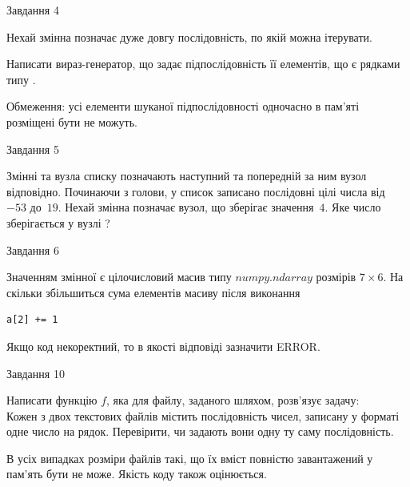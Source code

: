 \documentclass[12pt, ukrainian]{article}
\begin{document}
{               
{\begin{center}Завдання {4}\end{center}}
\vspace{-6mm}
Нехай змінна  позначає дуже довгу послідовність, по якій можна ітерувати.

Написати вираз-генератор, що задає підпослідовність її елементів, що є рядками типу .

Обмеження: усі елементи шуканої підпослідовності одночасно в пам'яті розміщені бути не можуть.\par

\vspace{10mm}
               
{\begin{center}Завдання {5}\end{center}}
\vspace{-6mm}
Змінні  та  вузла списку позначають наступний та попередній за ним вузол відповідно. Починаючи з голови, у список записано послідовні цілі числа від~$-53$ до~$19$. Нехай змінна  позначає вузол, що зберігає значення~$4$.
Яке число зберігається у вузлі  ?\par

               
{\begin{center}Завдання {6}\end{center}}
\vspace{-6mm}
Значенням змінної  є цілочисловий масив типу $numpy.ndarray$ розмірів $7{\times}6$. На скільки збільшиться сума елементів масиву  після виконання
\begin{verbatim}
a[2] += 1
\end{verbatim}


Якщо код некоректний, то в якості відповіді зазначити ERROR.\par

               
{\begin{center}Завдання {10}\end{center}}
\vspace{-6mm}

Написати функцію $f$, яка для файлу, заданого шляхом, розв’язує задачу:\\ Кожен з двох текстових файлів містить послідовність чисел, записану у форматі одне число на рядок.  Перевірити, чи задають вони одну ту саму послідовність.

В усіх випадках розміри файлів такі, що їх вміст повністю завантажений у пам'ять бути не може. Якість коду також оцінюється.



}
\end{document}
